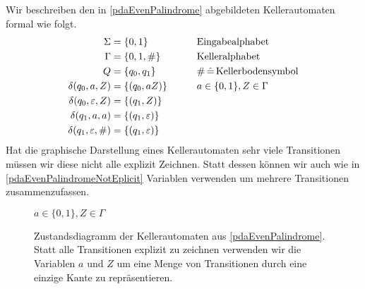 \begin{Bsp}
\label{bsp:pda-wwr}
Wir beschreiben den in \autoref{pdaEvenPalindrome} abgebildeten Kellerautomaten formal wie folgt.
        \begin{align}
                \Sigma &= \{0,1\} &\qquad&\text{Eingabealphabet} \notag\\
                \Gamma &= \{0,1,\#\} &&\text{Kelleralphabet} \notag\\
                Q &= \{q_0,q_1\} &&\#\,\hat=\,\text{Kellerbodensymbol} \notag\\
                \delta(q_0,a,Z) &= \{(q_0,aZ) \}&& a\in\{0,1\},Z\in\Gamma\\
                \delta(q_0,\varepsilon,Z) &= \{(q_1,Z)\} \label{eq:5.2}\\
                \delta(q_1,a,a) &= \{(q_1,\varepsilon)\}\\
                \delta(q_1,\varepsilon,\#) &= \{(q_1,\varepsilon)\}
        \end{align}
Hat die graphische Darstellung eines Kellerautomaten sehr viele Transitionen müssen wir diese nicht alle explizit Zeichnen.
Statt dessen können wir auch wie in \autoref{pdaEvenPalindromeNotEplicit}
Variablen verwenden um mehrere Transitionen zusammenzufassen.
        
\begin{figure}[H]\centering
   \begin{center}
  $a\in\{0,1\}, Z\in\Gamma$
\end{center}
	\caption{Zustandsdiagramm der Kellerautomaten aus \autoref{pdaEvenPalindrome}. 
	Statt alle Transitionen explizit zu zeichnen verwenden wir die Variablen $a$ und $Z$ um eine Menge von Transitionen durch eine einzige Kante zu repräsentieren. }
	\label{pdaEvenPalindromeNotEplicit}
\end{figure}
\end{Bsp}


